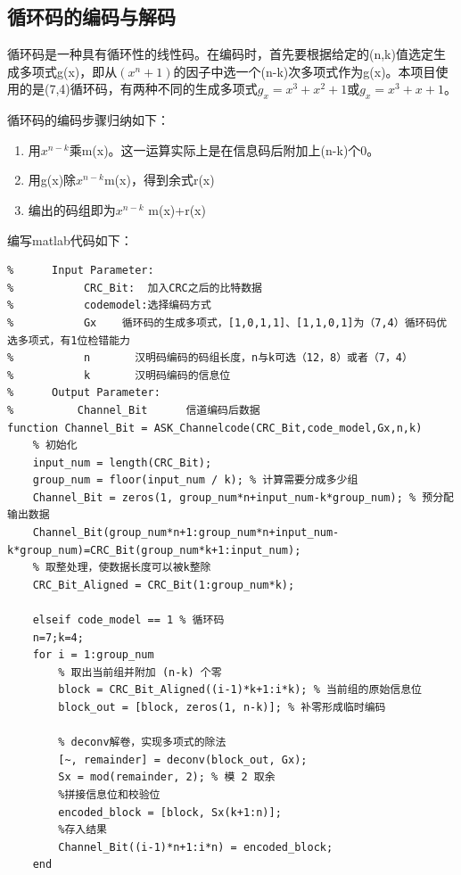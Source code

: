 \documentclass[UTF8]{ctexart}
\begin{document}
\subsection{循环码的编码与解码}
\label{para.3.5}

循环码是一种具有循环性的线性码。在编码时，首先要根据给定的(n,k)值选定生成多项式g(x)，即从$(x^n+1)$的因子中选一个(n-k)次多项式作为g(x)。本项目使用的是(7,4)循环码，有两种不同的生成多项式$g_x=x^3+x^2+1$或$g_x=x^3+x+1$。

循环码的编码步骤归纳如下：

\begin{enumerate}
    \item 用$x^{n-k}$乘m(x)。这一运算实际上是在信息码后附加上(n-k)个0。
    \item 用g(x)除$x^{n-k}$m(x)，得到余式r(x)
    \item 编出的码组即为$x^{n-k}$ m(x)+r(x)
\end{enumerate}

编写matlab代码如下：

\begin{lstlisting}[title=ASK\_Channelcode.m(循环码部分), frame=shadowbox]
%  Parameter List:
%      Input Parameter:
%           CRC_Bit:  加入CRC之后的比特数据
%           codemodel:选择编码方式 
%           Gx    循环码的生成多项式，[1,0,1,1]、[1,1,0,1]为（7,4）循环码优选多项式，有1位检错能力
%           n       汉明码编码的码组长度，n与k可选（12，8）或者（7，4）
%           k       汉明码编码的信息位
%      Output Parameter:
%          Channel_Bit      信道编码后数据
function Channel_Bit = ASK_Channelcode(CRC_Bit,code_model,Gx,n,k) 
    % 初始化
    input_num = length(CRC_Bit);
    group_num = floor(input_num / k); % 计算需要分成多少组
    Channel_Bit = zeros(1, group_num*n+input_num-k*group_num); % 预分配输出数据
    Channel_Bit(group_num*n+1:group_num*n+input_num-k*group_num)=CRC_Bit(group_num*k+1:input_num);
    % 取整处理，使数据长度可以被k整除
    CRC_Bit_Aligned = CRC_Bit(1:group_num*k);

    elseif code_model == 1 % 循环码
    n=7;k=4;
    for i = 1:group_num
        % 取出当前组并附加 (n-k) 个零
        block = CRC_Bit_Aligned((i-1)*k+1:i*k); % 当前组的原始信息位
        block_out = [block, zeros(1, n-k)]; % 补零形成临时编码
        
        % deconv解卷，实现多项式的除法
        [~, remainder] = deconv(block_out, Gx);
        Sx = mod(remainder, 2); % 模 2 取余
        %拼接信息位和校验位
        encoded_block = [block, Sx(k+1:n)];
        %存入结果
        Channel_Bit((i-1)*n+1:i*n) = encoded_block;
    end
\end{lstlisting}
\end{document}
